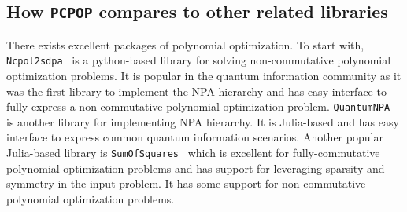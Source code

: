 \subsection{How \texttt{PCPOP} compares to other related libraries}
There exists excellent packages of polynomial optimization. To start with, \texttt{Ncpol2sdpa}~\cite{10.1145/2699464} is a python-based library for solving non-commutative polynomial optimization problems. It is popular in the quantum information community as it was the first library to implement the NPA hierarchy and has easy interface to fully express a non-commutative polynomial optimization problem. \texttt{QuantumNPA}~\cite{woodhead2024QuantumNPA} is another library for implementing NPA hierarchy. It is Julia-based and has easy interface to express common quantum information scenarios. Another popular Julia-based library is \texttt{SumOfSquares}~\cite{weisser2019polynomial} which is excellent for fully-commutative polynomial optimization problems and has support for leveraging sparsity and symmetry in the input problem. It has some support for non-commutative polynomial optimization problems. 

